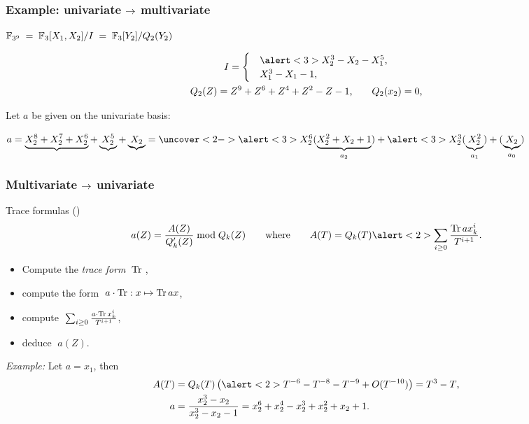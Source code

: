 \documentclass[10pt,usepdftitle=false]{beamer}
\begin{document}
\begin{frame}
  \frametitle{Example: univariate $\rightarrow$ multivariate}
  
  \begin{center}
    \large\emph{$\mathbb{F}_{3^9} \;=\; \mathbb{F}_3[X_1,X_2]/I \;=\; \mathbb{F}_3[Y_2]/Q_2(Y_2)$}
  \end{center}

  \begin{gather*}
    I = 
    \begin{cases}
      &\alert<3>{X_2^3 - X_2 - X_1^5}\text{,}\\
      &X_1^3 - X_1 - 1\text{,}
    \end{cases}
    \\
    Q_2(Z) = Z^9 + Z^6 + Z^4 + Z^2 - Z - 1\text{,} \qquad Q_2(x_2) = 0\text{,}
  \end{gather*}

  \bigskip

  Let $a$ be given on the univariate basis:

  \smallskip

  \mbox{$a = \underbrace{X_2^8 + X_2^7 + X_2^6} + \underbrace{X_2^5} +
    \underbrace{X_2} = \uncover<2->{\alert<3>{X_2^6}(\underbrace{X_2^2
        + X_2 + 1}_{a_2}) + \alert<3>{X_2^3}(\underbrace{X_2^2}_{a_1})
      + (\underbrace{X_2}_{a_0})}$}
  
  \bigskip

  \bigskip

\end{frame}


\begin{frame}
  \frametitle{Multivariate $\rightarrow$ univariate}


  \begin{block}{Trace formulas (\cite{rouiller99})}
      \[
      a(Z) = \frac{A(Z)}{Q_k'(Z)}\bmod Q_k(Z)
      \qquad\text{where}\qquad
      A(T) = Q_k(T)\alert<2>{\sum_{i\ge 0}\frac{\Tr ax_k^i}{T^{i+1}}}
      \text{.}\]
    \begin{itemize}
    \item Compute the \textit{trace form} $\;\operatorname{Tr}\;$,
    \item compute the form $\;a\cdot\operatorname{Tr} : x\mapsto \operatorname{Tr} ax$,
    \item \alert<2>{compute $\;\sum_{i\ge 0}\frac{a\cdot\operatorname{Tr} x_k^i}{T^{i+1}}$},
    \item deduce $\;a(Z)$.
    \end{itemize}
  \end{block}

  \emph{Example:} Let $a = x_1$, then
  \begin{align*}
    A(T) &= Q_k(T) \left(\alert<2>{T^{-6} - T^{-8} - T^{-9} + O(T^{-10})}\right) = T^3 - T\text{,}\\
    a &= \frac{x_2^3 - x_2}{x_2^3 - x_2 - 1} = x_2^6 +
    x_2^4 - x_2^3 + x_2^2 + x_2 + 1\text{.}
  \end{align*}
\end{frame}
\end{document}
